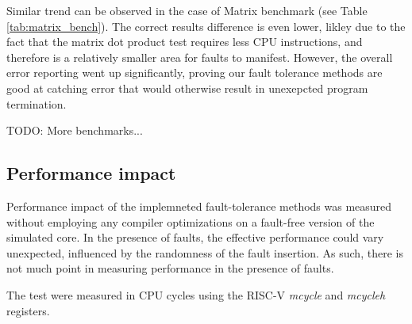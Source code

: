 \begin{table}[h]
\centering
{}
\caption{Matrix multiplication benchmark statistics}
\label{tab:matrix_bench}
\end{table}

Similar trend can be observed in the case of Matrix benchmark (see Table \ref{tab:matrix_bench}). The correct results difference is even lower, likley due to the fact that the matrix dot product test requires less CPU instructions, and therefore is a relatively smaller area for faults to manifest. However, the overall error reporting went up significantly, proving our fault tolerance methods are good at catching error that would otherwise result in unexepcted program termination.

TODO: More benchmarks...

\subsection{Performance impact}

Performance impact of the implemneted fault-tolerance methods was measured without employing any compiler optimizations on a fault-free version of the simulated core. In the presence of faults, the effective performance could vary unexpected, influenced by the randomness of the fault insertion. As such, there is not much point in measuring performance in the presence of faults.

The test were measured in CPU cycles using the RISC-V \textit{mcycle} and \textit{mcycleh} registers.

\begin{table}[h]
\centering
{}
\caption{Execution time comparison between unprotected and protected tests}
\label{tab:time_increase}
\end{table}

